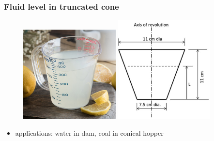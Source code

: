 \documentclass[english,14pt]{beamer}
\begin{document}
%
%
%
%


\begin{frame}[fragile]

\frametitle{Fluid level in truncated cone}

\vspace*{-3mm}
\begin{figure}[ht]
	\centering
	\includegraphics[width=0.45\textwidth]{figures/measuringCup}\hspace*{2mm}%
	\includegraphics[width=0.45\textwidth]{figures/cupDimensions}
\end{figure}

\begin{itemize}
	\item applications: water in dam, coal in conical hopper
\end{itemize}

\end{frame}
\end{document}
